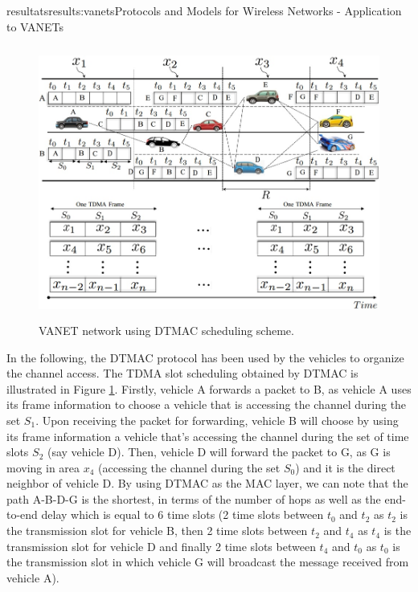 \documentclass{ra2016}
\begin{document}
\begin{module}{resultats}{results:vanets}{Protocols and Models for Wireless Networks - Application to VANETs}
\begin{figure}[H]
    \begin{center}
        \includegraphics[height=9cm,width=15cm]{IMG/TRPM.jpg}
        \caption{VANET network using DTMAC scheduling scheme.}
        \label{figc:trpm}
    \end{center}
\end{figure}

In the following, the DTMAC protocol has been used by the vehicles to organize the channel access. The TDMA slot 
scheduling obtained by DTMAC is illustrated in Figure \ref{figc:trpm}. Firstly, vehicle A forwards a packet to B, as  vehicle A uses its frame 
information to choose a vehicle that is accessing the channel during the set $S_1$. Upon receiving the packet for forwarding, vehicle B 
will choose by using its frame information a vehicle that's accessing the channel during the set of time slots $S_2$ 
(say vehicle D). Then, vehicle D will forward the packet to G, as G is moving in area $x_4$ (accessing the channel during the 
set $S_0$) and it is the direct neighbor of vehicle D. By using DTMAC as the MAC layer, we can note that the path A-B-D-G is 
the shortest, in terms of the number of hops as well as the end-to-end delay which  is equal to 6 time slots  (2 time slots 
between $t_0$ and $t_2$ as $t_2$ is the transmission slot for vehicle B, then 2 time slots between $t_2$ and $t_4$ as $t_4$ is the 
transmission slot for vehicle D and finally 2 time slots between $t_4$ and $t_0$ as $t_0$ is the transmission slot in which vehicle 
G will broadcast the message received from  vehicle A). 



\end{module}
\end{document}
